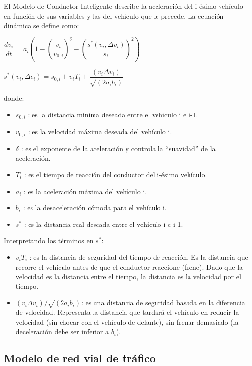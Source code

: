 \documentclass[colorinlistoftodos,twoside,twocolumn]{article} %
\begin{document}
	El Modelo de Conductor Inteligente describe la aceleración del i-ésimo vehículo en función de sus variables y las del vehículo que le precede. La ecuación dinámica se define como:
	
	\begin{center}
		$  \dfrac{dv_{i}}{dt} = a_{i} \left(1 - \left(\dfrac{v_{i}}{v_{0,i}}\right)^{\delta} - \left(\dfrac{s^{*}(v_{i}, \Delta v_{i})}{s_{i}}\right)^{2}\right)$
		
		\vspace{0.5em}
		$ s^{*}(v_{i}, \Delta v_{i}) =  s_{0,i} + v_{i}T_{i} + \dfrac{(v_{i} \Delta v_{i})}{\sqrt{(2a_{i} b_{i})}}$
	\end{center}
	donde:
	\begin{itemize}
		\item $ s_{0,i} $ : es la distancia mínima deseada entre el vehículo i e i-1.
		\item $ v_{0,i} $ : es la velocidad máxima deseada del vehículo i.
		\item $\delta$ : es el exponente de la aceleración y controla la “suavidad” de la aceleración.
		\item $ T_{i} $  : es el tiempo de reacción del conductor del i-ésimo vehículo.
		\item $ a_{i} $ : es la aceleración máxima del vehículo i.
		\item $ b_{i} $ : es la desaceleración cómoda para el vehículo i.
		\item $ s^{*} $ : es la distancia real deseada entre el vehículo i e i-1.
	\end{itemize}
	
	Interpretando los t\'erminos en $ s^{*} $:
	\begin{itemize}
		\item $ v_{i}T_{i}  $ : es la distancia de seguridad del tiempo de reacción. Es la distancia que recorre el vehículo antes de que el conductor reaccione (frene).
		Dado que la velocidad es la distancia entre el tiempo, la distancia es la velocidad por el tiempo.
		\item $ (v_{i} \Delta v_{i})/\sqrt{(2a_{i} b_{i})} $: es una distancia de seguridad basada en la diferencia de velocidad. Representa la distancia que tardará el vehículo en reducir la velocidad (sin chocar con el vehículo de delante), sin frenar demasiado (la deceleración debe ser inferior a $ b_{i} $).
	\end{itemize}
	
	\subsection{Modelo de red vial de tráfico}
	
\end{document}
